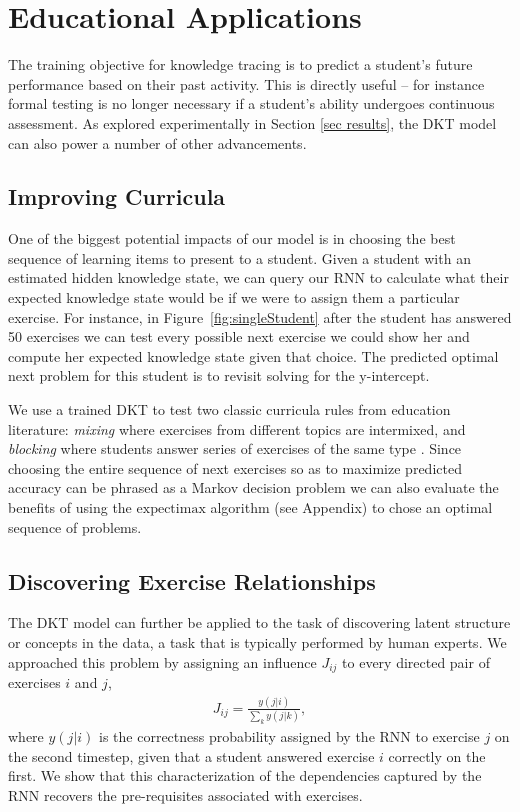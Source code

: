 \section{Educational Applications}

The training objective for knowledge tracing is to predict a student's future performance based on their past activity.
This is directly useful -- for instance formal testing is no longer necessary if a student's ability undergoes continuous assessment.
As explored experimentally in Section \ref{sec results},
the DKT model can also power a number of other advancements.


\subsection{Improving Curricula}

One of the biggest potential impacts of our model is in choosing the best sequence of learning items to present to a student. 
Given a student with an estimated hidden knowledge state, we can query our RNN to calculate what their expected knowledge state would be if we were to assign them a particular exercise.
For instance, in Figure~\ref{fig:singleStudent} after the student has answered 50 exercises we can test every possible next exercise we could show her and compute her expected knowledge state given that choice.
The predicted optimal next problem for this student is to revisit solving for the y-intercept.

We use a trained DKT to test two classic curricula rules from education literature: {\em mixing} where exercises from different topics are intermixed, and {\em blocking} where students answer series of exercises of the same type \cite{rohrer2009effects}. Since choosing the entire sequence of next exercises so as to maximize predicted accuracy can be phrased as a Markov decision problem we can also evaluate the benefits of using the $\mathrm{expectimax}$ algorithm (see Appendix) to chose an optimal sequence of problems.


\subsection{Discovering Exercise Relationships}

The DKT model can further be applied to the task of discovering latent structure or concepts in the data, a task that is typically performed by human experts.
We approached this problem by assigning an influence $J_{ij}$ to every directed pair of exercises $i$ and $j$,
\begin{align}
\label{eq influence}
J_{ij} = \frac{y\left(j|i\right)}{\sum_k y\left(j|k\right)},
\end{align}
where $y\left(j|i\right)$ is the correctness probability assigned by the RNN to exercise $j$ on the second timestep, given that a student answered exercise $i$ correctly on the first.
We show that this characterization of the dependencies captured by the RNN recovers the pre-requisites associated with exercises.




